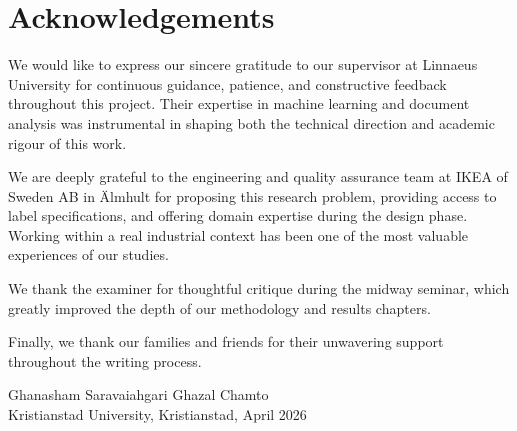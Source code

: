 \chapter*{Acknowledgements}

We would like to express our sincere gratitude to our supervisor at Linnaeus University for
continuous guidance, patience, and constructive feedback throughout this project. Their
expertise in machine learning and document analysis was instrumental in shaping both
the technical direction and academic rigour of this work.

We are deeply grateful to the engineering and quality assurance team at IKEA of Sweden
AB in Älmhult for proposing this research problem, providing access to label specifications,
and offering domain expertise during the design phase. Working within a real industrial
context has been one of the most valuable experiences of our studies.

We thank the examiner for thoughtful critique during the midway seminar, which greatly
improved the depth of our methodology and results chapters.

Finally, we thank our families and friends for their unwavering support throughout the
writing process.

\vspace{2em}
\begin{flushright}
Ghanasham Saravaiahgari \qquad Ghazal Chamto\\
Kristianstad University, Kristianstad, April 2026
\end{flushright}
\clearpage
